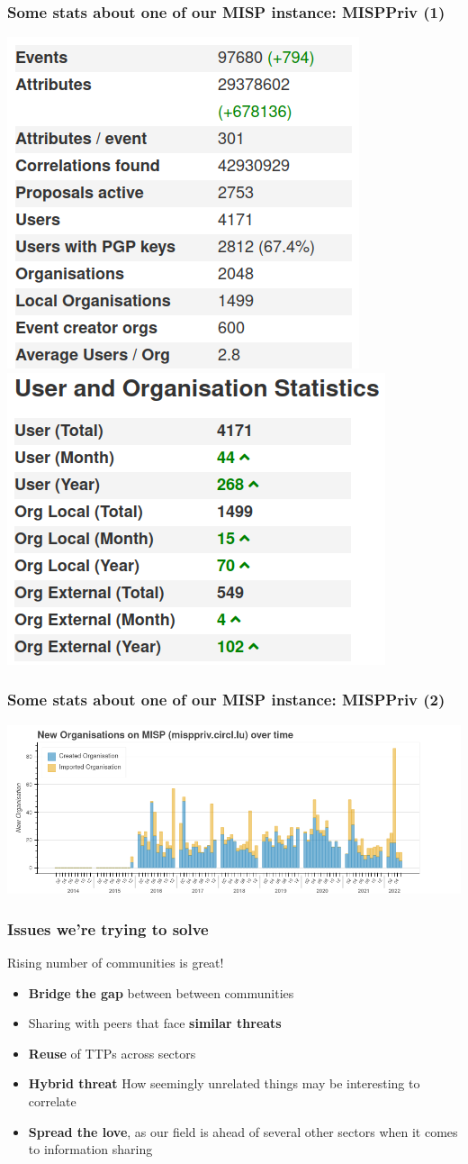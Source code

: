 \begin{frame}
\frametitle{Some stats about one of our MISP instance: MISPPriv (1)}
    \includegraphics[width=0.45\linewidth]{pictures/misppriv-usage.png}
    \includegraphics[width=0.45\linewidth]{pictures/misppriv-user-org-stats.png}
\end{frame}

\begin{frame}
    \frametitle{Some stats about one of our MISP instance: MISPPriv (2)}
    \begin{center}
        \includegraphics[width=1.1\linewidth]{pictures/bokeh_new_org.png}
    \end{center}
\end{frame}

\begin{frame}
\frametitle{Issues we're trying to solve}
    Rising number of communities is great!
    \begin{itemize}
        \item \textbf{Bridge the gap} between between communities
        \item Sharing with peers that face \textbf{similar threats}
        \item \textbf{Reuse} of TTPs across sectors
        \item \textbf{Hybrid threat} How seemingly unrelated things may be interesting to correlate
        \item \textbf{Spread the love}, as our field is ahead of several other sectors when it comes to information sharing
    \end{itemize}
\end{frame}

